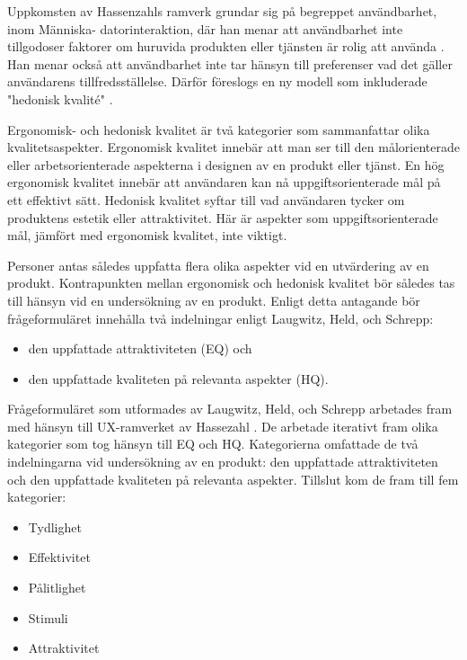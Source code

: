 {Uppkomsten av Hassenzahls ramverk grundar sig på begreppet användbarhet, inom Människa- datorinteraktion, där han menar att användbarhet inte tillgodoser faktorer om huruvida produkten eller tjänsten är rolig att använda \cite{HassenzahlUserQuality}. Han menar också att användbarhet inte tar hänsyn till preferenser vad det gäller användarens tillfredsställelse. Därför föreslogs en ny modell som inkluderade "hedonisk kvalité" \cite{HassenzahlUserQuality} . 
\newline

Ergonomisk- och hedonisk kvalitet är två kategorier som sammanfattar olika kvalitetsaspekter\cite{HassenzahlUserQuality}. Ergonomisk kvalitet innebär att man ser till den målorienterade eller arbetsorienterade aspekterna i designen av en produkt eller tjänst\cite{HassenzahlUserQuality}. En hög ergonomisk kvalitet innebär att användaren kan nå uppgiftsorienterade mål på ett effektivt sätt\cite{HassenzahlUserQuality}. Hedonisk kvalitet syftar till vad användaren tycker om produktens estetik eller attraktivitet\cite{HassenzahlUserQuality}. Här är aspekter som uppgiftsorienterade mål, jämfört med ergonomisk kvalitet, inte viktigt\cite{HassenzahlUserQuality}. 
\newline

Personer antas således uppfatta flera olika aspekter vid en utvärdering av en produkt\cite{HassenzahlUserQuality}. Kontrapunkten mellan ergonomisk och hedonisk kvalitet bör således tas till hänsyn vid en undersökning av en produkt\cite{Laugwitz2008ConstructionQuestionnaire}. Enligt detta antagande bör frågeformuläret innehålla två indelningar enligt Laugwitz, Held, och Schrepp\cite{Laugwitz2008ConstructionQuestionnaire}:
\begin{itemize}
\item den uppfattade attraktiviteten (EQ) och
\item den uppfattade kvaliteten på relevanta aspekter (HQ).
\end{itemize}

Frågeformuläret som utformades av Laugwitz, Held, och Schrepp arbetades fram med hänsyn till UX-ramverket av Hassezahl \cite{Laugwitz2008ConstructionQuestionnaire}. De arbetade iterativt fram olika kategorier som tog hänsyn till EQ och HQ. Kategorierna omfattade de två indelningarna vid undersökning av en produkt: den uppfattade attraktiviteten och den uppfattade kvaliteten på relevanta aspekter. Tillslut kom de fram till fem kategorier\cite{Laugwitz2008ConstructionQuestionnaire}: 
\begin{itemize}
\item Tydlighet
\item Effektivitet
\item Pålitlighet
\item Stimuli
\item Attraktivitet
\end{itemize}

}
